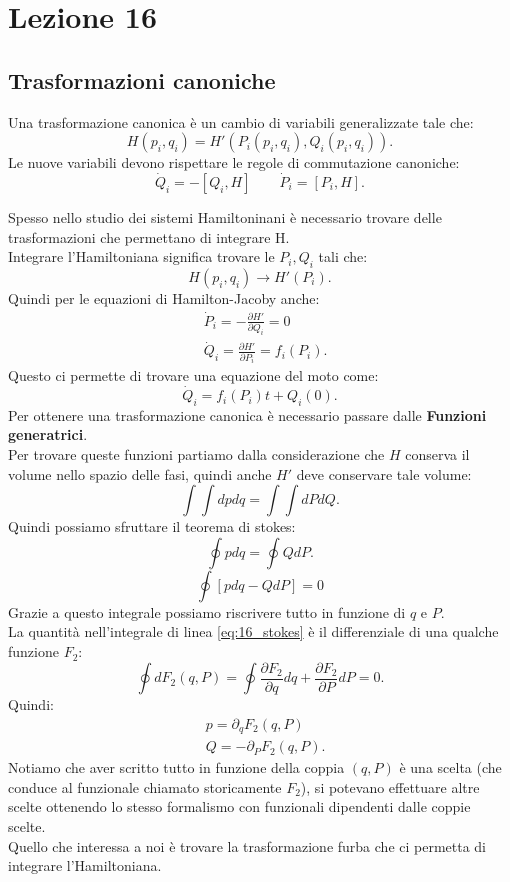 \section{Lezione 16}%
\label{sub:Lezione 16}
\subsection{Trasformazioni canoniche}%
\label{sub:Trasformazioni canoniche}
\begin{redbox}{}
    Una trasformazione canonica è un cambio di variabili generalizzate tale che:
    \[
        H(p_i, q_i) = H'(P_i(p_i,q_i), Q_i(p_i, q_i) ) 
    .\] 
    Le nuove variabili devono rispettare le regole di commutazione canoniche:
    \[
	\dot{Q}_i = - \left[ Q_i,H\right] \qquad \dot{P}_i = \left[P_i, H\right]
    .\] 
\end{redbox}
\noindent
Spesso nello studio dei sistemi Hamiltoninani è necessario trovare delle trasformazioni che permettano di integrare H. \\
Integrare l'Hamiltoniana significa trovare le $P_i, Q_i$  tali che:
\[
    H(p_i, q_i) \to H'(P_i) 
.\] 
Quindi per le equazioni di Hamilton-Jacoby anche:
\[\begin{aligned}
    & \dot{P}_i = - \frac{\partial H'}{\partial Q_i} =0\\
    & \dot{Q}_i = \frac{\partial H'}{\partial P_i} = f_i(P_i) 
.\end{aligned}\]
Questo ci permette di trovare una equazione del moto come:
\[
    \dot{Q}_i = f_i(P_i) t + Q_i(0) 
.\] 
Per ottenere una trasformazione canonica è necessario passare dalle \textbf{Funzioni generatrici}.\\
Per trovare queste funzioni partiamo dalla considerazione che $H$ conserva il volume nello spazio delle fasi, quindi anche $H'$ deve conservare tale volume:
\[
    \int\int dpdq = \int\int dPdQ
.\] 
Quindi possiamo sfruttare il teorema di stokes:
\[
    \oint pdq = \oint  QdP
.\] 
\begin{equation}
    \oint  \left[pdq - QdP\right] = 0 
    \label{eq:16_stokes}
\end{equation}
Grazie a questo integrale possiamo riscrivere tutto in funzione di $q$ e $P$.\\
La quantità nell'integrale di linea \ref{eq:16_stokes} è il differenziale di una qualche funzione $F_2$:
\[
    \oint dF_2(q,P) = \oint \frac{\partial F_2}{\partial q} dq + \frac{\partial F_2}{\partial P} dP = 0 
.\] 
Quindi:
\[\begin{aligned}
    &p = \partial_{q}F_2(q,P) \\
    &Q = - \partial_{P}F_2(q,P) 
.\end{aligned}\]
Notiamo che aver scritto tutto in funzione della coppia $(q,P)$ è una scelta (che conduce al funzionale chiamato storicamente $F_2$), si potevano effettuare altre scelte ottenendo lo stesso formalismo con funzionali dipendenti dalle coppie scelte.\\
Quello che interessa a noi è trovare la trasformazione furba che ci permetta di integrare l'Hamiltoniana.
